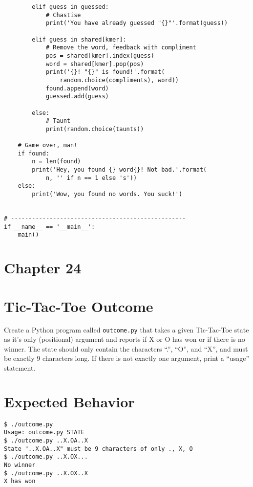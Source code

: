 \documentclass[]{article}
\begin{document}
\begin{verbatim}
        elif guess in guessed:
            # Chastise
            print('You have already guessed "{}"'.format(guess))

        elif guess in shared[kmer]:
            # Remove the word, feedback with compliment
            pos = shared[kmer].index(guess)
            word = shared[kmer].pop(pos)
            print('{}! "{}" is found!'.format(
                random.choice(compliments), word))
            found.append(word)
            guessed.add(guess)

        else:
            # Taunt
            print(random.choice(taunts))

    # Game over, man!
    if found:
        n = len(found)
        print('Hey, you found {} word{}! Not bad.'.format(
            n, '' if n == 1 else 's'))
    else:
        print('Wow, you found no words. You suck!')


# --------------------------------------------------
if __name__ == '__main__':
    main()
\end{verbatim}

\pagebreak

\hypertarget{chapter-24}{%
\section{Chapter 24}\label{chapter-24}}

\hypertarget{tic-tac-toe-outcome}{%
\section{Tic-Tac-Toe Outcome}\label{tic-tac-toe-outcome}}

Create a Python program called \texttt{outcome.py} that takes a given
Tic-Tac-Toe state as it's only (positional) argument and reports if X or
O has won or if there is no winner. The state should only contain the
characters ``.'', ``O'', and ``X'', and must be exactly 9 characters
long. If there is not exactly one argument, print a ``usage'' statement.

\hypertarget{expected-behavior-3}{%
\section{Expected Behavior}\label{expected-behavior-3}}

\begin{verbatim}
$ ./outcome.py
Usage: outcome.py STATE
$ ./outcome.py ..X.OA..X
State "..X.OA..X" must be 9 characters of only ., X, O
$ ./outcome.py ..X.OX...
No winner
$ ./outcome.py ..X.OX..X
X has won
\end{verbatim}
\end{document}
